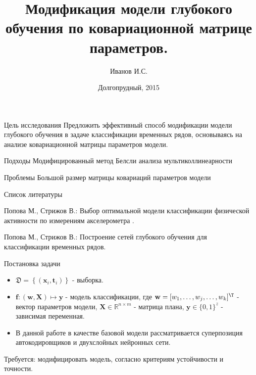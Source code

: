 \documentclass[10pt,pdf,russian]{beamer}
\begin{document}
\title{Модификация модели глубокого обучения по ковариационной матрице параметров.}
\author{Иванов И.С.}
\date{Долгопрудный, 2015}

\begin{frame}
	\titlepage
\end{frame}

\begin{frame}
\begin{block}{Цель исследования}
Предложить эффективный способ модификации модели глубокого обучения в задаче классификации временных рядов, основываясь на анализе ковариационной матрицы параметров модели.
\end{block}

\begin{block}{Подходы}
Модифицированный метод Белсли анализа мультиколлинеарности
\end{block}


\begin{block}{Проблемы}
Большой размер матрицы ковариаций параметров модели
\end{block}
\end{frame}

\begin{frame}{Список литературы}
\begin{enumerate}

Попова М., Стрижов В.: Выбор оптимальной модели классификации физической активности по измерениям акселерометра .

Попова М., Стрижов В.: Построение сетей глубокого обучения для классификации временных рядов.

\end{enumerate}
\end{frame}

\begin{frame}{Постановка задачи}
\begin{itemize}
\item $\mathfrak{D} =\left\{ (\mathbf{x}_i, \mathbf{t}_i) \right\}$ - выборка.
\item $\mathbf{f} : (\mathbf{w},\mathbf{X}) \mapsto \mathbf{y}$ - модель классификации, где $\mathbf{w} = [w_1, \dots,w_j,\dots,w_k]^{\T}$ - вектор параметров модели, $\mathbf{X} \in \mathbb{R}^{n\times m}$ - матрица плана, $\mathbf{y} \in \{0,1\}^z$ - зависимая переменная. 
\item В данной работе в качестве базовой модели рассматривается суперпозиция автокодировщиков и двухслойных нейронных сети.
\end{itemize}
Требуется: модифицировать модель, согласно критериям устойчивости и точности.
\end{frame}
\end{document}
